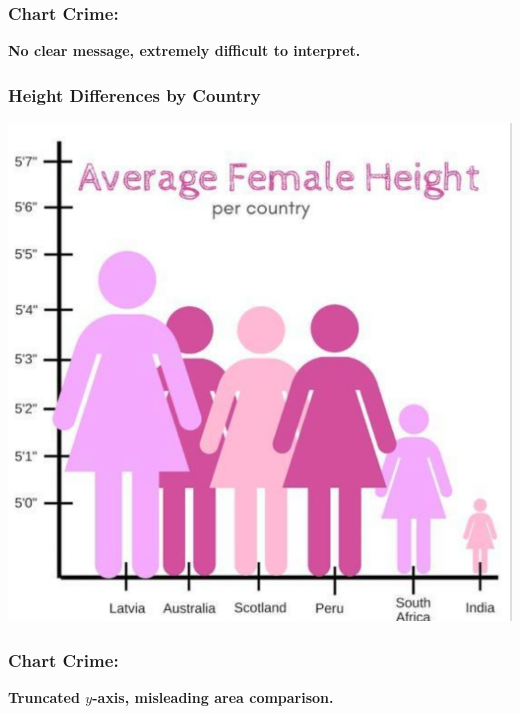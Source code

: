 \documentclass[aspectratio=169]{beamer}
\theoremstyle{principle}
\begin{document}
\begin{frame}
\frametitle{Chart Crime:}

\begin{center}
\huge \textbf{No clear message, extremely difficult to interpret.}
\end{center}

\end{frame}

\begin{frame}
\frametitle{Height Differences by Country}
\begin{center}
\includegraphics[scale=0.4]{giant_vs_small.png}
\end{center}

\end{frame}

\begin{frame}
\frametitle{Chart Crime:}

\begin{center}
\huge \textbf{Truncated $y$-axis, misleading area comparison.}
\end{center}

\end{frame}
\end{document}
